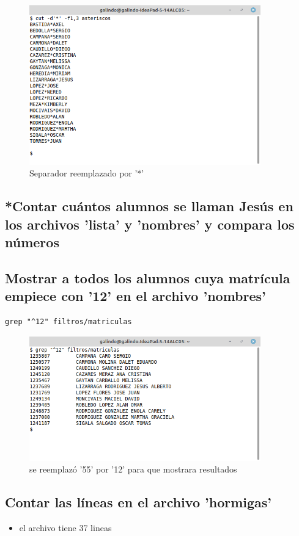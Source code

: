\documentclass[11pt]{article}
\begin{document}
\begin{figure}[htbp]
\centering
\includegraphics[width=10cm]{img/a14b.png}
\caption{Separador reemplazado por '*'}
\end{figure}

\subsection{*Contar cuántos alumnos se llaman Jesús en los archivos 'lista' y 'nombres' y compara los números}
\label{sec:org1d7b877}
\subsection{Mostrar a todos los alumnos cuya matrícula empiece con '12' en el archivo 'nombres'}
\label{sec:org5d783ce}
\begin{verbatim}
grep "^12" filtros/matriculas
\end{verbatim}

\begin{figure}[htbp]
\centering
\includegraphics[width=10cm]{img/a16.png}
\caption{se reemplazó '55' por '12' para que mostrara resultados}
\end{figure}

\subsection{Contar las líneas en el archivo 'hormigas'}
\label{sec:orgc21f77b}
\begin{itemize}
\item el archivo tiene 37 lineas
\end{itemize}
\end{document}
